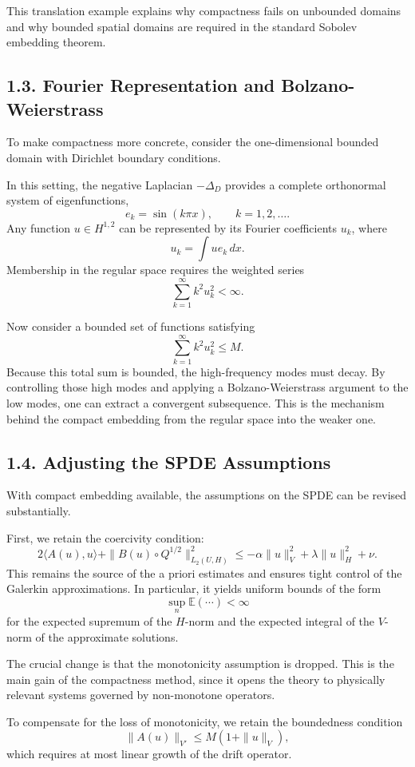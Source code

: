 \documentclass[11pt]{article}
\theoremstyle{definition}
\theoremstyle{remark}
\begin{document}
This translation example explains why compactness fails on unbounded domains and why bounded spatial domains are required in the standard Sobolev embedding theorem.

\subsection*{1.3. Fourier Representation and Bolzano-Weierstrass}
To make compactness more concrete, consider the one-dimensional bounded domain with Dirichlet boundary conditions.

In this setting, the negative Laplacian \(-\Delta_D\) provides a complete orthonormal system of eigenfunctions,
\[
e_k=\sin(k\pi x), \qquad k=1,2,\dots.
\]
Any function \(u\in H^{1,2}\) can be represented by its Fourier coefficients \(u_k\), where
\[
u_k=\int u e_k\,dx.
\]
Membership in the regular space requires the weighted series
\[
\sum_{k=1}^\infty k^2 u_k^2<\infty.
\]

Now consider a bounded set of functions satisfying
\[
\sum_{k=1}^\infty k^2 u_k^2\le M.
\]
Because this total sum is bounded, the high-frequency modes must decay. By controlling those high modes and applying a Bolzano-Weierstrass argument to the low modes, one can extract a convergent subsequence. This is the mechanism behind the compact embedding from the regular space into the weaker one.

\subsection*{1.4. Adjusting the SPDE Assumptions}
With compact embedding available, the assumptions on the SPDE can be revised substantially.

First, we retain the coercivity condition:
\[
2\langle A(u),u\rangle+\|B(u)\circ Q^{1/2}\|_{L_2(U,H)}^2
\le
-\alpha\|u\|_V^2+\lambda\|u\|_H^2+\nu.
\]
This remains the source of the a priori estimates and ensures tight control of the Galerkin approximations. In particular, it yields uniform bounds of the form
\[
\sup_n \mathbb E(\cdots)<\infty
\]
for the expected supremum of the \(H\)-norm and the expected integral of the \(V\)-norm of the approximate solutions.

The crucial change is that the monotonicity assumption is dropped. This is the main gain of the compactness method, since it opens the theory to physically relevant systems governed by non-monotone operators.

To compensate for the loss of monotonicity, we retain the boundedness condition
\[
\|A(u)\|_{V'}\le M(1+\|u\|_V),
\]
which requires at most linear growth of the drift operator.
\end{document}

